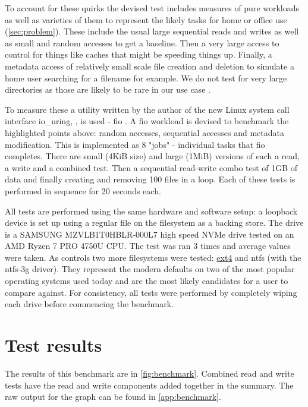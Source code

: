         To account for these quirks the devised test includes measures of pure
        workloads as well as varieties of them to represent the likely tasks
        for home or office use (\autoref{sec:problem}). These include the usual
        large sequential reads and writes as well as small and random accesses
        to get a baseline. Then a very large access to control for things like
        caches that might be speeding things up. Finally, a metadata access of
        relatively small scale file creation and deletion to simulate a home
        user searching for a filename for example. We do not test for very
        large directories as those are likely to be rare in our use case
        \cite{contents_study}.

        To measure these a utility written by the author of the new Linux
        system call interface io\_uring, , is used - fio
        \cite{fio}. A fio workload is devised to benchmark the highlighted
        points above: random accesses, sequential accesses and metadata
        modification. This is implemented as 8 "jobs" - individual tasks that
        fio completes. There are small (4KiB size) and large (1MiB) versions
        of each a read, a write and a combined test. Then a sequential
        read-write combo test of 1GB of data and finally creating and removing
        100 files in a loop. Each of these tests is performed in sequence for
        20 seconds each.

        All tests are performed using the same hardware and software setup: a
        loopback device is set up using a regular file on the filesystem as a
        backing store. The drive is a SAMSUNG MZVLB1T0HBLR-000L7 high speed
        NVMe drive tested on an AMD Ryzen 7 PRO 4750U CPU. The test was ran 3
        times and average values were taken. As controls two more filesystems
        were tested: \hyperref[sec:ext4]{ext4} and ntfs (with the ntfs-3g driver).
        They represent the modern defaults on two of the most popular operating
        systems used today and are the most likely candidates for a user to
        compare against. For consistency, all tests were performed by
        completely wiping each drive before commencing the benchmark.


    \section{Test results}

        The results of this benchmark are in \autoref{fig:benchmark}.
        Combined read and write tests have the read and write components added
        together in the summary. The raw output for the graph can be found in
        \autoref{app:benchmark}.

